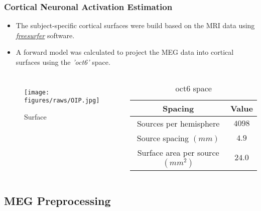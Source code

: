 \documentclass[aspectratio=169]{beamer}
\begin{document}
\begin{frame}
    \frametitle{Cortical Neuronal Activation Estimation}

    \begin{itemize}
        \item The subject-specific cortical surfaces were build based on the MRI data using \hyperlink{https://surfer.nmr.mgh.harvard.edu/}{\emph{freesurfer}} software.
        \item A forward model was calculated to project the MEG data into cortical surfaces using the \emph{'oct6'} space.
    \end{itemize}

    \begin{columns}

        \begin{figure}[h]
            \centering
            \texttt{[image: figures/raws/OIP.jpg]}
            \caption{Surface}
        \end{figure}


        \begin{table}
            \renewcommand{\arraystretch}{1.2}
            \caption{oct6 space}

            \begin{tabular}{|c|c|}
                \hline
                \textbf{Spacing}                 & \textbf{Value} \\
                \hline
                \hline
                Sources per hemisphere           & $4098$         \\
                Source spacing $(mm)$            & $4.9$          \\
                Surface area per source $(mm^2)$ & $24.0$         \\
                \hline
            \end{tabular}

        \end{table}

    \end{columns}

\end{frame}

\subsection{MEG Preprocessing}
\end{document}
